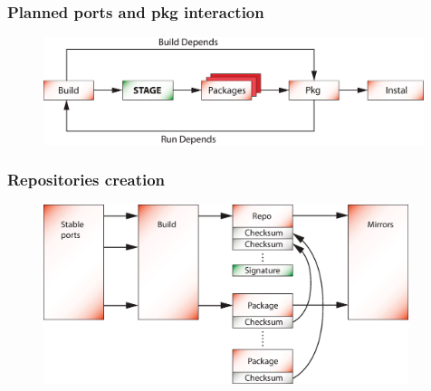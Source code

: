 \documentclass{beamer}
\begin{document}
\begin{frame}
\frametitle{Planned ports and pkg interaction}
\begin{figure}[h!]
  \centering
  \includegraphics[width=0.99\textwidth]{q2.eps}
\end{figure}
\end{frame}

\begin{frame}
\frametitle{Repositories creation}
\begin{figure}[h!]
  \centering
  \includegraphics[width=0.95\textwidth]{q3.eps}
\end{figure}
\end{frame}

\end{document}

